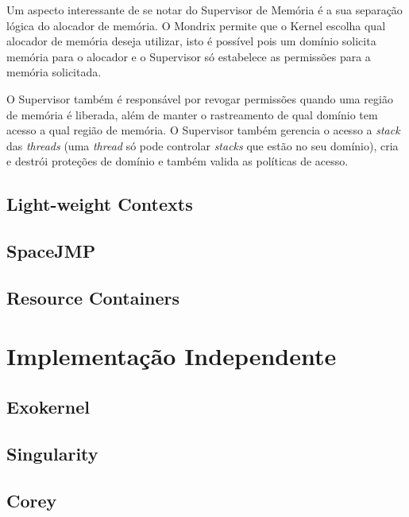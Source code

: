 Um aspecto interessante de se notar do Supervisor de Memória é a sua separação
lógica do alocador de memória. O Mondrix permite que o Kernel escolha qual
alocador de memória deseja utilizar, isto é possível pois um domínio solicita
memória para o alocador e o Supervisor só estabelece as permissões para a
memória solicitada.

O Supervisor também é responsável por revogar permissões quando uma região de
memória é liberada, além de manter o rastreamento de qual domínio tem acesso a
qual região de memória. O Supervisor também gerencia o acesso a \emph{stack}
das \emph{threads} (uma \emph{thread} só pode controlar \emph{stacks} que estão
no seu domínio), cria e destrói proteções de domínio e também valida as
políticas de acesso.

\subsection{Light-weight Contexts}

\subsection{SpaceJMP}

\subsection{Resource Containers}

\section{Implementação Independente}

\subsection{Exokernel}

\subsection{Singularity}

\subsection{Corey}

